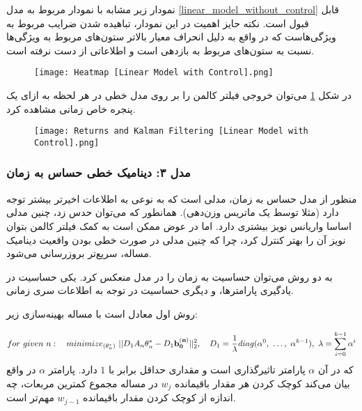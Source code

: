 \documentclass{scribe-cgenomics}
\begin{document}
\begin{مشاهده}
نمودار زیر مشابه با نمودار مربوط به مدل
\ref{linear_model_without_control}
قابل قبول است. نکته حایز اهمیت در این نمودار، تباهیده شدن ضرایب مربوط به ویژگی‌هاست که در واقع به دلیل انحراف معیار بالاتر ستون‌های مربوط به ویژگی‌ها نسبت به ستون‌های مربوط به بازدهی است و اطلاعاتی از دست نرفته است.

\begin{figure}
\texttt{[image: Heatmap [Linear Model with Control].png]}
\centering
\end{figure}
\end{مشاهده}

\begin{نتیجه}
در شکل
\ref{kalman_1}
 می‌توان خروجی فیلتر کالمن را بر روی مدل خطی در هر لحظه به ازای یک پنجره خاص زمانی مشاهده کرد.

\begin{figure}\label{kalman_1}
\texttt{[image: Returns and Kalman Filtering [Linear Model with Control].png]}
\centering
\end{figure}
\end{نتیجه}




\subsubsection{مدل ۳: دینامیک خطی حساس به زمان}
منظور از مدل حساس به زمان، مدلی است که به نوعی به  اطلاعات اخیرتر بیشتر توجه دارد (مثلا توسط یک ماتریس وزن‌دهی). همانطور که می‌توان حدس زد، چنین مدلی اساسا واریانس نویز بیشتری دارد. اما در عوض ممکن است به کمک فیلتر کالمن بتوان نویز آن را بهتر کنترل کرد، چرا که چنین مدلی در صورت خطی بودن واقعیت دینامیک مساله، سریع‌تر بروزرسانی می‌شود.

به دو روش می‌توان حساسیت به زمان را در مدل منعکس کرد. یکی حساسیت در یادگیری پارامترها، و دیگری حساسیت در توجه به اطلاعات سری زمانی.

روش اول معادل است با مساله بهینه‌سازی زیر:

\begin{equation}\label{first_weighted_linear_model_with_control_optimization}
for\ given\ n:\quad minimize_{(\theta^*_n)}\ ||D_1A_n\theta^*_n - D_1\bold{b^{(n)}_0}||_2^2,
\quad
D_1 = \dfrac{1}{\lambda}diag(\alpha^0,\ \dots, \ \alpha^{k-1}),\ \lambda= \sum_{i=0}^{k-1} \alpha^i
\end{equation}
که در آن
$\alpha$
پارامتر تاثیرگذاری است و مقداری حداقل برابر با
$1$
دارد. پارامتر
$\alpha$
در واقع بیان می‌کند کوچک کردن هر مقدار باقیمانده
$w_j$
در مساله مجموع کمترین مربعات، چه اندازه از کوچک کردن مقدار باقیمانده
$w_{j-1}$
مهم‌تر است.
\end{document}
